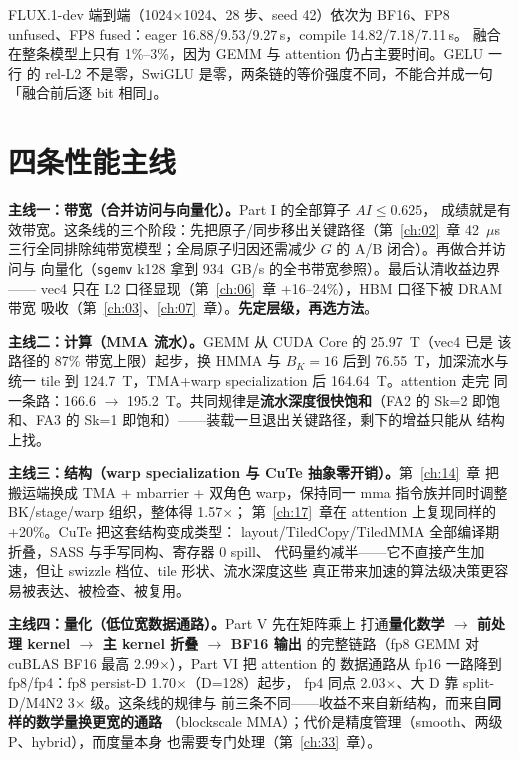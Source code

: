 FLUX.1-dev 端到端（1024$\times$1024、28 步、seed 42）依次为 BF16、FP8
unfused、FP8 fused：eager 16.88/9.53/9.27\,s，compile 14.82/7.18/7.11\,s。
融合在整条模型上只有 1\%--3\%，因为 GEMM 与 attention 仍占主要时间。GELU 一行
的 rel-L2 不是零，SwiGLU 是零，两条链的等价强度不同，不能合并成一句
「融合前后逐 bit 相同」。

\section{四条性能主线}

\textbf{主线一：带宽（合并访问与向量化）。}\allowbreak{}Part I 的全部算子 $AI \le 0.625$，
成绩就是有效带宽。这条线的三个阶段：先把原子/同步移出关键路径（第~\ref{ch:02}~章
42~$\mu$s 三行全同排除纯带宽模型；全局原子归因还需减少 $G$ 的 A/B 闭合）。再做合并访问与
向量化（\texttt{sgemv} k128 拿到 934~GB/s 的全书带宽参照）。最后认清收益边界——
vec4 只在 L2 口径显现（第~\ref{ch:06}~章 +16--24\%），HBM 口径下被 DRAM 带宽
吸收（第~\ref{ch:03}、\ref{ch:07}~章）。\textbf{先定层级，再选方法}。

\textbf{主线二：计算（MMA 流水）。}\allowbreak{}GEMM 从 CUDA Core 的 25.97~T（vec4 已是
该路径的 87\% 带宽上限）起步，换 HMMA 与 $B_K{=}16$ 后到 76.55~T，加深流水与
统一 tile 到 124.7~T，TMA+warp specialization 后 164.64~T。attention 走完
同一条路：166.6 $\to$ 195.2~T。共同规律是\textbf{流水深度很快饱和}（FA2 的
Sk=2 即饱和、FA3 的 Sk=1 即饱和）——装载一旦退出关键路径，剩下的增益只能从
结构上找。

\textbf{主线三：结构（warp specialization 与 CuTe 抽象零开销）。}第~\ref{ch:14}~章
把搬运端换成 TMA + mbarrier + 双角色 warp，保持同一 mma 指令族并同时调整 BK/stage/warp 组织，整体得 1.57$\times$；
第~\ref{ch:17}~章在 attention 上复现同样的 +20\%。CuTe 把这套结构变成类型：
layout/TiledCopy/TiledMMA 全部编译期折叠，SASS 与手写同构、寄存器 0 spill、
代码量约减半——它不直接产生加速，但让 swizzle 档位、tile 形状、流水深度这些
真正带来加速的算法级决策更容易被表达、被检查、被复用。

\textbf{主线四：量化（低位宽数据通路）。}\allowbreak{}Part V 先在矩阵乘上
打通\textbf{量化数学 $\to$ 前处理 kernel $\to$ 主 kernel 折叠 $\to$ BF16 输出}
的完整链路（fp8 GEMM 对 cuBLAS BF16 最高 2.99$\times$），Part VI 把
attention 的
数据通路从 fp16 一路降到 fp8/fp4：fp8 persist-D 1.70$\times$（D=128）起步，
fp4 同点 2.03$\times$、大 D 靠 split-D/M4N2 3$\times$ 级。这条线的规律与
前三条不同——收益不来自新结构，而来自\textbf{同样的数学量换更宽的通路}
（blockscale MMA）；代价是精度管理（smooth、两级 P、hybrid），而度量本身
也需要专门处理（第~\ref{ch:33}~章）。
